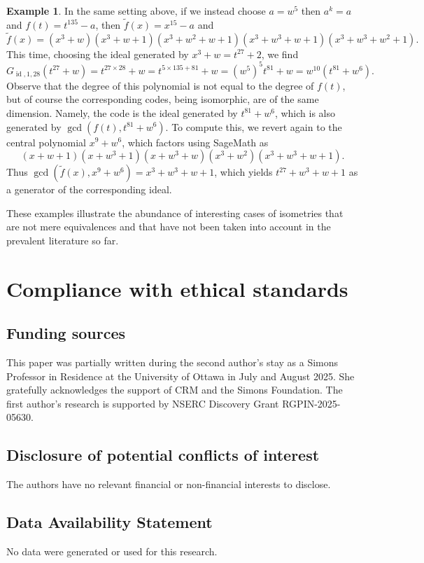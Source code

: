 \documentclass[11pt]{amsart}
\theoremstyle{plain}
\theoremstyle{definition}
\newtheorem{example}[theorem]{Example}
\numberwithin{equation}{section}
\numberwithin{figure}{section}
\DeclareMathOperator{\id}{id}
\begin{document}
\begin{example}
    In the same setting above, if we instead choose $a=w^5$ then $a^k=a$ and $f(t)=t^{135}-a$, then $\tilde{f}(x)=x^{15}-a$ and
    $$
    \tilde{f}(x)=(x^3 + w)  (x^3 + w + 1)  (x^3 + w^2 + w + 1)  (x^3 + w^3 + w + 1)  (x^3 + w^3 + w^2 + 1).
    $$
    This time, choosing the ideal generated by $x^3+w=t^{27}+2$, we find $$G_{\id,1,28}(t^{27}+w)=t^{27\times 28}+w = t^{5\times135+81}+w=(w^5)^5t^{81}+w = w^{10}(t^{81}+w^{6}).$$
Observe that the  degree of this polynomial is not equal to the degree of $f(t)$, but of course the corresponding codes, being isomorphic, are of the same dimension.  Namely, the code is the ideal generated by $t^{81}+w^{6}$, which is also generated by $\gcd(f(t),t^{81}+w^6)$. To compute this, we revert again to the central polynomial $x^9+w^6$, which factors using SageMath as
    $$
(x + w + 1)(x + w^3 + 1)(x + w^3 + w)(x^3 + w^2) (x^3 + w^3 + w + 1).
    $$
Thus $\gcd(\tilde{f}(x),x^9+w^6)=x^3 + w^3 + w + 1$, which yields $t^{27}+w^3+w+1$ as a generator of the corresponding  ideal.
\end{example}


These examples illustrate the abundance of interesting cases of isometries that are not mere equivalences and that have not been taken into account in the prevalent literature so far.



\section{Compliance with ethical standards}

\subsection*{Funding sources} This paper was partially written during the second author's stay as a Simons Professor in Residence at the University of Ottawa in July and August 2025. She gratefully acknowledges the support of CRM and the Simons Foundation. The first author's research is supported by NSERC Discovery Grant RGPIN-2025-05630.


\subsection*{Disclosure of potential conflicts of interest} The authors have no relevant financial or non-financial interests to disclose.

\subsection*{Data Availability Statement} No data were generated or used for this research.
\end{document}

